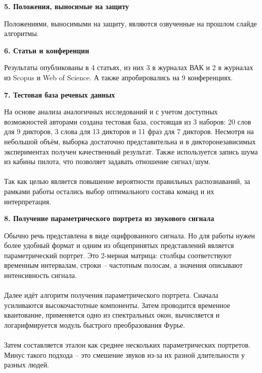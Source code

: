 \documentclass[a4paper, 12pt]{article}
\begin{document}
	
	
	\begin{center}
		\textbf{\large 5. Положения, выносимые на защиту}
	\end{center}	
	\noindent
	Положениями, выносимыми на защиту, являются озвученные на прошлом слайде алгоритмы.
	
	
	
	\begin{center}
		\textbf{\large 6. Статьи и конференции}
	\end{center}	
	\noindent
	Результаты опубликованы в 4 статьях, из них 3 в журналах ВАК и 2 в журналах из Scopus и Web of Science. А также апробировались на 9 конференциях.
	
	
	
	\begin{center}
		\textbf{\large 7. Тестовая база речевых данных}
	\end{center}	
	\noindent
	На основе анализа аналогичных исследований и с учетом доступных возможностей авторами создана тестовая база, состоящая из 3 наборов: 20 слов для 9 дикторов, 3 слова для 13 дикторов и 11 фраз для 7 дикторов. Несмотря на небольшой объём, выборка достаточно представительна и в дикторонезависимых экспериментах получен качественный результат. Также используется запись шума из кабины пилота, что позволяет задавать отношение сигнал/шум.
	\\\\
	Так как целью является повышение вероятности правильных распознаваний, за рамками работы остались выбор оптимального состава команд и их интерпретация.
	
	
	
	\begin{center}
		\textbf{\large 8. Получение параметрического портрета из звукового сигнала}
	\end{center}	
	\noindent
	Обычно речь представлена в виде оцифрованного сигнала. Но для работы нужен более удобный формат и одним из общепринятых представлений является параметрический портрет. Это 2-мерная матрица: столбцы соответствуют временным интервалам, строки – частотным полосам, а значения описывают интенсивность сигнала.
	\\\\
	Далее идёт алгоритм получения параметрического портрета. Сначала усиливаются высокочастотные компоненты. Затем проводится временное квантование, применяется одно из спектральных окон, вычисляется и логарифмируется модуль быстрого преобразования Фурье.
	\\\\
	Затем составляется эталон как среднее нескольких параметрических портретов. Минус такого подхода – это смешение звуков из-за их разной длительности у разных людей.
	
\end{document}
